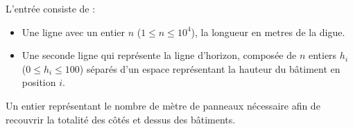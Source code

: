 \begin{Input}
	L'entrée consiste de :
	\begin{itemize}
		\item Une ligne avec un entier $n$ ($1 \le n \le 10^4$), la longueur en metres de la digue.
		\item Une seconde ligne qui représente la ligne d'horizon, composée de $n$ entiers $h_i$ ($0 \le h_i \le 100$) séparés d'un espace représentant la hauteur du bâtiment en position $i$.
	\end{itemize}
\end{Input}

\begin{Output}
	Un entier représentant le nombre de mètre de panneaux nécessaire afin de recouvrir la totalité des côtés et dessus des bâtiments.
\end{Output}

